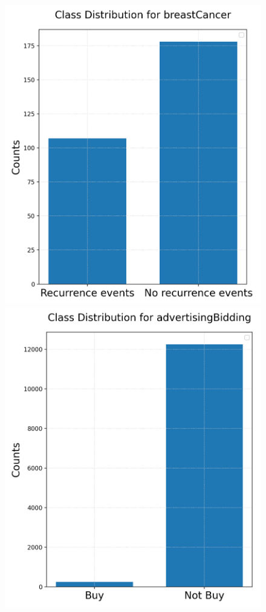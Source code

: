 \documentclass{article}
\begin{document}
\begin{figure}[h!]
\begin{minipage}[b]{0.32\textwidth}
	\end{minipage}
	\begin{minipage}[b]{0.32\textwidth}
	\includegraphics[width=\textwidth]{Plots/Inbalance_breastCancer.png}
	\end{minipage}
	\begin{minipage}[b]{0.32\textwidth}
	\includegraphics[width=\textwidth]{Plots/Inbalance_advertisingBidding.png}

\end{minipage}
\end{figure}
\end{document}

